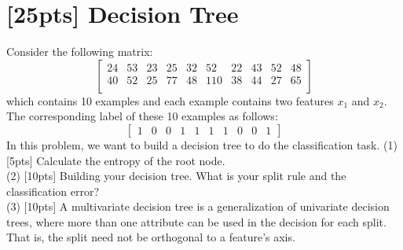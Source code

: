 \documentclass{article}
\begin{document}
	\section{[25pts] {Decision Tree}}
	Consider the following matrix:
	$$
	\left[
	\begin{matrix}
	24 & 53 & 23 & 25 & 32 & 52 & 22 & 43 & 52 & 48 \\
	40 & 52 & 25 & 77 & 48 & 110 & 38 & 44 & 27 & 65\\
	\end{matrix}
	\right]
	$$
	which contains 10 examples and each example contains two features $x_1$ and $x_2$. The corresponding label of these 10 examples as follows:
	$$
	\left[
	\begin{matrix}
	1 & 0 & 0 &1 & 1 & 1 & 1& 0 & 0 & 1
	\end{matrix}
	\right]
	$$
	In this problem, we want to build a decision tree to do the classification task.
	(1) [5pts] Calculate the entropy of the root node.\\
	(2) [10pts] Building your decision tree. What is your split rule  and the classification error?\\
	(3) [10pts] A multivariate decision tree is a generalization of  univariate decision trees, where more than one attribute can be used in the decision for each split. That is, the split need not be orthogonal to a feature's axis.
	
\end{document}
